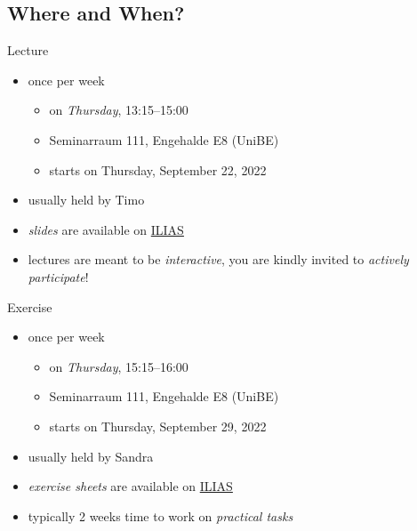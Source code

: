 \subsection{Where and When?}

\begin{frame}{\myframetitle}
	\begin{mycolumns}
		\begin{definition}{Lecture}
			\begin{itemize}
				\item once per week
				\begin{itemize}
					\item on \emph{Thursday}, 13:15--15:00
					\item Seminarraum 111, Engehalde E8 (UniBE)
					\item starts on Thursday, September 22, 2022
				\end{itemize}
				\item usually held by Timo
				\item \emph{slides} are available on \href{https://ilias.unibe.ch/goto_ilias3_unibe_crs_2469231.html}{ILIAS}
				\item lectures are meant to be \emph{interactive}, you are kindly invited to \emph{actively participate}!
			\end{itemize}
		\end{definition}
	\mynextcolumn
		\begin{example}{Exercise}
			\begin{itemize}
				\item once per week 
				\begin{itemize}
					\item on \emph{Thursday}, 15:15--16:00
					\item Seminarraum 111, Engehalde E8 (UniBE)
					\item starts on Thursday, September 29, 2022
				\end{itemize}
				\item usually held by Sandra
				\item \emph{exercise sheets} are available on \href{https://ilias.unibe.ch/goto_ilias3_unibe_crs_2469231.html}{ILIAS}
				\item typically 2 weeks time to work on \emph{practical tasks}
			\end{itemize}
		\end{example}
	\end{mycolumns}
\end{frame}

